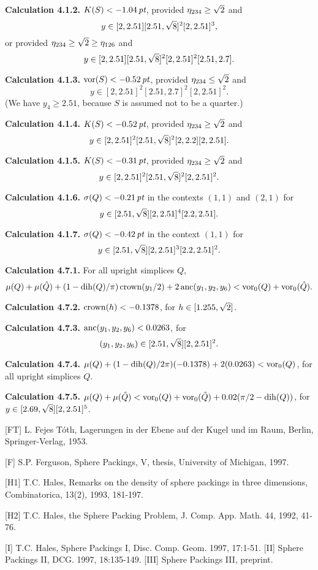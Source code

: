 {\bf Calculation 4.1.2.}
$K(S) < -1.04\,\hbox{\it pt}$, 
	provided $\eta_{234}\ge\sqrt2$
	and $$y\in[2,2.51][2.51,\sqrt8]^2[2,2.51]^3,$$
	or provided $\eta_{234}\ge\sqrt2\ge\eta_{126}$
	and $$y\in[2,2.51][2.51,\sqrt8]^2[2,2.51]^2[2.51,2.7].$$

{\bf Calculation 4.1.3.}  $\operatorname{vor}(S) < -0.52\,\hbox{\it pt}$,
	provided $\eta_{234}\le\sqrt2$
	and $$y\in[2,2.51]^2[2.51,2.7]^2[2,2.51]^2.$$
(We have $y_4\ge 2.51$, because $S$ is assumed not to be a quarter.)

{\bf Calculation 4.1.4.}  $K(S) < -0.52\,\hbox{\it pt}$, provided 
	$\eta_{234}\ge\sqrt2$
	and $$y\in[2,2.51]^2[2.51,\sqrt8]^2[2,2.2][2,2.51].$$

{\bf Calculation 4.1.5.}  $K(S) < -0.31\,\hbox{\it pt}$, provided
	$\eta_{234}\ge\sqrt2$
	and $$y\in[2,2.51]^2[2.51,\sqrt8]^2[2,2.51]^2.$$

{\bf Calculation 4.1.6.}  $\sigma(Q) < -0.21\,\hbox{\it pt}$ 
	in the contexts $(1,1)$ and $(2,1)$
	for 
	$$y\in[2.51,\sqrt8][2,2.51]^4[2.2,2.51].$$

{\bf Calculation 4.1.7.}  $\sigma(Q) < -0.42\,\hbox{\it pt}$ 
	in the context $(1,1)$
	for $$y\in[2.51,\sqrt8][2,2.51]^3[2.2,2.51]^2.$$

{\bf Calculation 4.7.1.}
	For all upright simplices $Q$,
	$$\mu(Q)+\mu(\hat Q)
	+(1-\operatorname{dih}(Q)/\pi)\operatorname{crown}(y_1/2)+2\operatorname{anc}(y_1,y_2,y_6)
		< \operatorname{vor}_0(Q)+\operatorname{vor}_0(\hat Q).$$

{\bf Calculation 4.7.2.}
	$\operatorname{crown}(h) < -0.1378$, for $h\in [1.255,\sqrt2]$.

{\bf Calculation 4.7.3.}
	$\operatorname{anc}(y_1,y_2,y_6) < 0.0263$, for $$(y_1,y_2,y_6)
		\in [2.51,\sqrt8][2,2.51]^2.$$

{\bf Calculation 4.7.4.}
	$\mu(Q) + (1-\operatorname{dih}(Q)/2\pi)(-0.1378) + 2(0.0263) < \operatorname{vor}_0(Q)$, 
		for all upright simplices $Q$.

{\bf Calculation 4.7.5.}
	$\mu(Q)+\mu(\hat Q) <
	\operatorname{vor}_0(Q)+\operatorname{vor}_0(\hat Q) +
	0.02 (\pi/2-\operatorname{dih}(Q))$, for $y\in [2.69,\sqrt8][2,2.51]^5$.

\bigskip
{}\endhead


[FT] L. Fejes T\'oth, Lagerungen in der Ebene auf der Kugel und im Raum,
	Berlin, Springer-Verlag, 1953.

[F] S.P. Ferguson, Sphere Packings, V, thesis, University of Michigan, 1997.

[H1] T.C. Hales, Remarks on the density of sphere packings in three
	dimensions, Combinatorica, 13(2), 1993, 181-197.

[H2] T.C. Hales, the Sphere Packing Problem, J. Comp. App. Math. 44, 1992,
	41-76.

[I]  T.C. Hales, Sphere Packings I, Disc. 
        Comp. Geom. 1997, 17:1-51.  [II] Sphere Packings II, 
	DCG. 1997, 18:135-149. [III] Sphere Packings III, preprint.

\enddocument
\bye
